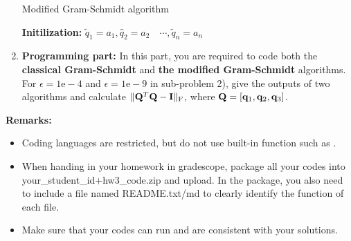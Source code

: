 \documentclass[english,onecolumn]{IEEEtran}
\begin{document}
\begin{enumerate}
\begin{algorithm}[htbp]
	\label{alg:modified_gs}
\caption{Modified Gram-Schmidt algorithm}
\SetAlgoLined
{}
\textbf{Initilization:}  $ \tilde{q}_{1}=a_{1}, \hat{q}_{2}=a_{2} \quad \cdots, \tilde{q}_{n}=a_{n} $    \\









\end{algorithm}
	\item \textbf{Programming part:}
	In this part, you are required to code both the \textbf{ classical Gram-Schmidt} and \textbf{the modified Gram-Schmidt} algorithms.
	For $\epsilon=1\text{e}-4$ and $\epsilon=1\text{e}-9$ in sub-problem 2), give the outputs of two algorithms and calculate $\|{\bf Q}^T {\bf Q} - {\bf I}\|_{\text{F}}$, where ${\bf Q} = [{\bf q}_1,{\bf q}_2,{\bf q}_3]$.
\end{enumerate}
\noindent\textbf{Remarks: }
\begin{itemize}
    \item Coding languages are restricted, but do not use built-in function such as .
    \item When handing in your homework in gradescope, package all your codes into {\sf your\_student\_id+hw3\_code.zip} and upload. In the package, you also need to include a file named {\sf README.txt/md} to clearly identify the function of each file.
     \item Make sure that your codes can run and are consistent with your solutions.
\end{itemize}
\end{document}
